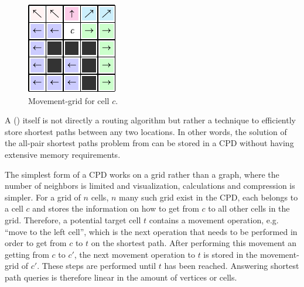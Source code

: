 			\begin{figure}
				\vspace{-0.8\baselineskip}
				\includegraphics[width=\linewidth]{images/botea-cpd.pdf}
				\caption{Movement-grid for cell $c$\cite{botea-cpd-2013}.}
			\end{figure}
		
			A  () itself is not directly a routing algorithm but rather a technique to efficiently store shortest paths between any two locations\cite{botea-cpd-2013}.
			In other words, the solution of the all-pair shortest paths problem from  can be stored in a CPD without having extensive memory requirements.
			
			The simplest form of a CPD works on a grid rather than a graph, where the number of neighbors is limited and visualization, calculations and compression is simpler.
			For a grid of $n$ cells, $n$ many such grid exist in the CPD, each belongs to a cell $c$ and stores the information on how to get from $c$ to all other cells in the grid.
			Therefore, a potential target cell $t$ contains a movement operation, e.g. \enquote{move to the left cell}, which is the next operation that needs to be performed in order to get from $c$ to $t$ on the shortest path.
			After performing this movement an getting from $c$ to $c'$, the next movement operation to $t$ is stored in the movement-grid of $c'$.
			These steps are performed until $t$ has been reached.
			Answering shortest path queries is therefore linear in the amount of vertices or cells.
			
